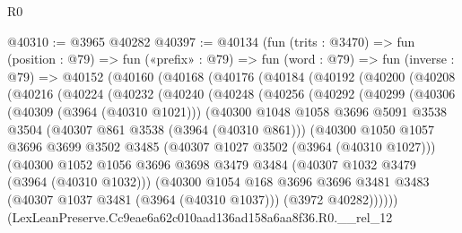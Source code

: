 \begin{lexlean}{R0}
\begin{coremodule}
@40310 := @3965 @40282
@40397 := @40134
    (fun (trits : @3470) =>
    fun (position : @79) =>
    fun («prefix» : @79) =>
    fun (word : @79) =>
    fun (inverse : @79) =>
    @40152
      (@40160
        (@40168
          (@40176
            (@40184
              (@40192
                (@40200
                  (@40208
                    (@40216
                      (@40224
                        (@40232
                          (@40240
                            (@40248
                              (@40256
                                (@40292
                                  (@40299
                                    (@40306
                                      (@40309 (@3964 (@40310 @1021)))
                                      (@40300
                                        @1048
                                        @1058
                                        @3696
                                        @5091
                                        @3538
                                        @3504
                                        (@40307 @861 @3538 (@3964 (@40310 @861)))
                                        (@40300
                                          @1050
                                          @1057
                                          @3696
                                          @3699
                                          @3502
                                          @3485
                                          (@40307 @1027 @3502 (@3964 (@40310 @1027)))
                                          (@40300
                                            @1052
                                            @1056
                                            @3696
                                            @3698
                                            @3479
                                            @3484
                                            (@40307 @1032 @3479 (@3964 (@40310 @1032)))
                                            (@40300
                                              @1054
                                              @168
                                              @3696
                                              @3696
                                              @3481
                                              @3483
                                              (@40307 @1037 @3481 (@3964 (@40310 @1037)))
                                              (@3972 @40282))))))
                                    (LexLeanPreserve.Cc9eae6a62c010aad136ad158a6aa8f36.R0.__rel_12

\end{coremodule}
\end{lexlean}
